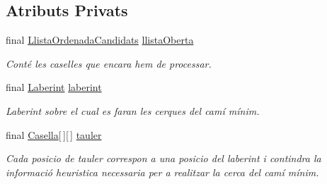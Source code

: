 \subsection*{Atributs Privats}
\begin{DoxyCompactItemize}
\item 
\hypertarget{classlogica_1_1algoritmica_1_1_a_estrella_1_1_buscador_cami_minim_a9d72cbd300ff4207b845ebfc37c72e8c}{final \hyperlink{classlogica_1_1algoritmica_1_1_llista_ordenada_candidats}{Llista\+Ordenada\+Candidats} \hyperlink{classlogica_1_1algoritmica_1_1_a_estrella_1_1_buscador_cami_minim_a9d72cbd300ff4207b845ebfc37c72e8c}{llista\+Oberta}}\label{classlogica_1_1algoritmica_1_1_a_estrella_1_1_buscador_cami_minim_a9d72cbd300ff4207b845ebfc37c72e8c}

\begin{DoxyCompactList}\small\item\em Conté les caselles que encara hem de processar. \end{DoxyCompactList}\item 
\hypertarget{classlogica_1_1algoritmica_1_1_a_estrella_1_1_buscador_cami_minim_a381ef30c585f82399a983b48ff67efda}{final \hyperlink{classlogica_1_1laberints_1_1_laberint}{Laberint} \hyperlink{classlogica_1_1algoritmica_1_1_a_estrella_1_1_buscador_cami_minim_a381ef30c585f82399a983b48ff67efda}{laberint}}\label{classlogica_1_1algoritmica_1_1_a_estrella_1_1_buscador_cami_minim_a381ef30c585f82399a983b48ff67efda}

\begin{DoxyCompactList}\small\item\em Laberint sobre el cual es faran les cerques del camí mínim. \end{DoxyCompactList}\item 
\hypertarget{classlogica_1_1algoritmica_1_1_a_estrella_1_1_buscador_cami_minim_a2ed56315845fb53a3709fe045f3dfe2e}{final \hyperlink{classlogica_1_1algoritmica_1_1_casella}{Casella}\mbox{[}$\,$\mbox{]}\mbox{[}$\,$\mbox{]} \hyperlink{classlogica_1_1algoritmica_1_1_a_estrella_1_1_buscador_cami_minim_a2ed56315845fb53a3709fe045f3dfe2e}{tauler}}\label{classlogica_1_1algoritmica_1_1_a_estrella_1_1_buscador_cami_minim_a2ed56315845fb53a3709fe045f3dfe2e}

\begin{DoxyCompactList}\small\item\em Cada posicio de tauler correspon a una posicio del laberint i contindra la informació heuristica necessaria per a realitzar la cerca del camí mínim. \end{DoxyCompactList}\end{DoxyCompactItemize}


